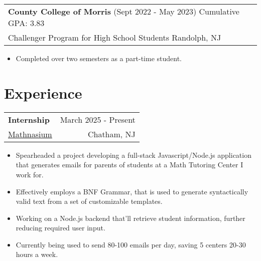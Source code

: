 \documentclass{article}
\begin{document}
    \vspace{-5pt}\begin{center}
        \begin{tabular}{p{}}
            {\large \bf County College of Morris} (Sept 2022 - May 2023) \hfill Cumulative GPA: 3.83 \\
            Challenger Program for High School Students \hfill Randolph, NJ
        \end{tabular}
    \end{center}
    \vspace{-10pt}\begin{itemize}
        \item Completed over two semesters as a part-time student.
    \end{itemize}

\section{Experience} \vspace{4pt}
    \raggedright\begin{tabular}{lr}
        \parbox[l]{3.65in}{\bf{\large{Internship}}} &
        \parbox[r]{3.65in}{\raggedleft March 2025 - Present} \\
        \parbox[l]{3.65in}{\href{https://www.mathnasium.com/math-centers/chatham}{\underline{Mathnasium}}} &
        \parbox[r]{3.65in}{\raggedleft Chatham, NJ}
    \end{tabular}
    \vspace{-10pt}\begin{itemize} 
        \setlength{\itemsep}{-2pt}
        \item Spearheaded a project developing a full-stack Javascript/Node.js application that generates emails for parents of students at a Math Tutoring Center I work for.
        \item Effectively employs a BNF Grammar, that is used to generate syntactically valid text from a set of customizable templates.
        \item Working on a Node.js backend that'll retrieve student information, further reducing required user input.
        \item Currently being used to send 80-100 emails per day, saving 5 centers 20-30 hours a week.
    \end{itemize}
\end{document}
